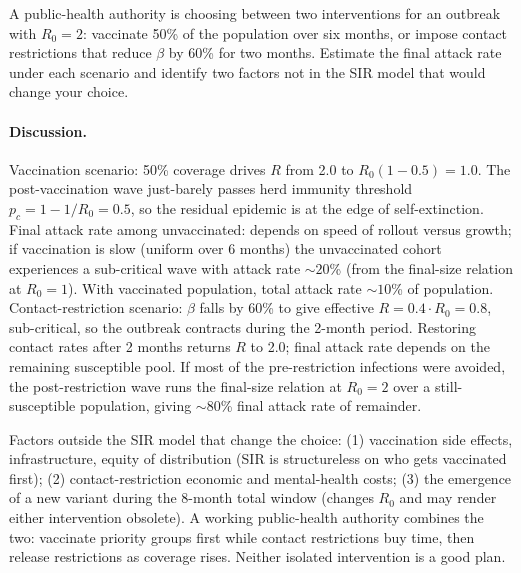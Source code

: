 \begin{exercise}
A public-health authority is choosing between two interventions for
an outbreak with $R_0 = 2$: vaccinate 50\% of the population over six
months, or impose contact restrictions that reduce $\beta$ by 60\%
for two months. Estimate the final attack rate under each scenario
and identify two factors not in the SIR model that would change
your choice.

\paragraph{Discussion.} Vaccination scenario: 50\% coverage drives
$R$ from 2.0 to $R_0 (1 - 0.5) = 1.0$. The post-vaccination wave
just-barely passes herd immunity threshold $p_c = 1 - 1/R_0 =
0.5$, so the residual epidemic is at the edge of self-extinction.
Final attack rate among unvaccinated: depends on speed of rollout
versus growth; if vaccination is slow (uniform over 6 months) the
unvaccinated cohort experiences a sub-critical wave with attack
rate $\sim 20$\% (from the final-size relation at $R_0 = 1$). With
vaccinated population, total attack rate $\sim 10$\% of population.
Contact-restriction scenario: $\beta$ falls by 60\% to give
effective $R = 0.4 \cdot R_0 = 0.8$, sub-critical, so the outbreak
contracts during the 2-month period. Restoring contact rates after
2 months returns $R$ to 2.0; final attack rate depends on the
remaining susceptible pool. If most of the pre-restriction
infections were avoided, the post-restriction wave runs the
final-size relation at $R_0 = 2$ over a still-susceptible
population, giving $\sim 80$\% final attack rate of remainder.

Factors outside the SIR model that change the choice: (1)
vaccination side effects, infrastructure, equity of distribution
(SIR is structureless on who gets vaccinated first); (2)
contact-restriction economic and mental-health costs; (3) the
emergence of a new variant during the 8-month total window
(changes $R_0$ and may render either intervention obsolete).
A working public-health authority combines the two: vaccinate
priority groups first while contact restrictions buy time, then
release restrictions as coverage rises. Neither isolated
intervention is a good plan.
\end{exercise}
